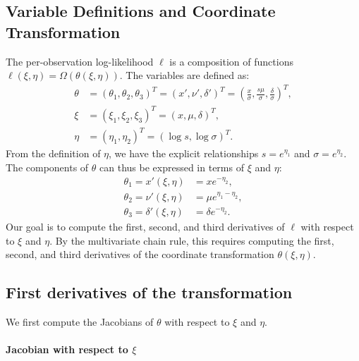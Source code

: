 \documentclass{article}
\begin{document}
\subsection{Variable Definitions and Coordinate Transformation}

The per-observation log-likelihood $\ell$ is a composition of functions $\ell(\xi, \eta) = \Omega(\theta(\xi, \eta))$.
The variables are defined as:
%
\begin{align}
  \theta & = (\theta_1, \theta_2, \theta_3)^T = (x', \nu', \delta')^T = \left(\frac{x}{\sigma}, \frac{s \mu}{\sigma}, \frac{\delta}{\sigma}\right)^T, \\
  \xi    & = (\xi_1, \xi_2, \xi_3)^T = (x, \mu, \delta)^T,                                                                                            \\
  \eta   & = (\eta_1, \eta_2)^T = (\log s, \log \sigma)^T.
\end{align}
%
From the definition of $\eta$, we have the explicit relationships $s = e^{\eta_1}$ and $\sigma = e^{\eta_2}$.
The components of $\theta$ can thus be expressed in terms of $\xi$ and $\eta$:
%
\begin{align}
  \theta_1 = x'(\xi, \eta)      & = x e^{-\eta_2},           \\
  \theta_2 = \nu'(\xi, \eta)    & = \mu e^{\eta_1 - \eta_2}, \\
  \theta_3 = \delta'(\xi, \eta) & = \delta e^{-\eta_2}.
\end{align}
%
Our goal is to compute the first, second, and third derivatives of $\ell$ with respect to $\xi$ and $\eta$.
By the multivariate chain rule, this requires computing the first, second, and third derivatives of the coordinate transformation $\theta(\xi, \eta)$.

\subsection{First derivatives of the transformation}

We first compute the Jacobians of $\theta$ with respect to $\xi$ and $\eta$.

\paragraph{Jacobian with respect to $\xi$}
\end{document}
